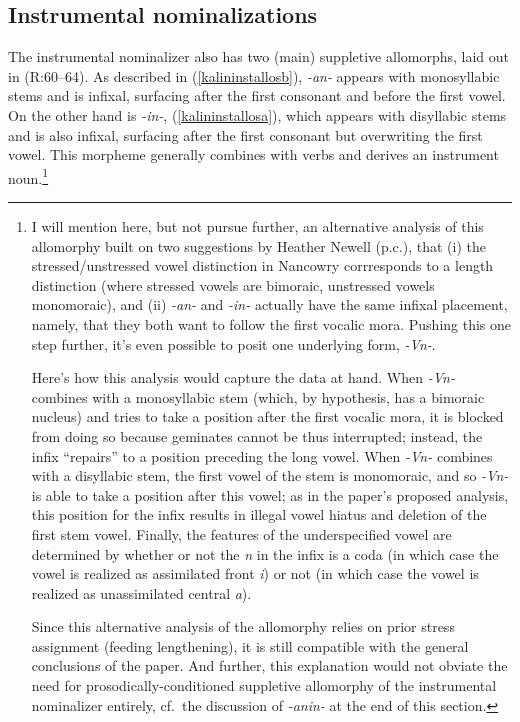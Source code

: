 \documentclass[output=paper]{langscibook}
\begin{document}
\subsection{Instrumental nominalizations}\label{sec:kalin:3.2}

The instrumental nominalizer also has two (main) suppletive allomorphs, laid out in \Next (R:60--64). As described in (\ref{kalininstallosb}), \textit{-an-} appears with monosyllabic stems and is infixal, surfacing after the first consonant and before the first vowel. On the other hand is \textit{-in-}, (\ref{kalininstallosa}), which appears with disyllabic stems and is also infixal, surfacing after the first consonant but overwriting the first vowel. This morpheme generally combines with verbs and derives an instrument noun.\footnote{I will mention here, but not pursue further, an alternative analysis of this allomorphy built on two suggestions by Heather Newell (p.c.), that (i) the stressed/unstressed vowel distinction in Nancowry corrresponds to a length distinction (where stressed vowels are bimoraic, unstressed vowels monomoraic), and (ii) \textit{-an-} and \textit{-in-} actually have the same infixal placement, namely, that they both want to follow the first vocalic mora. Pushing this one step further, it's even possible to posit one underlying form, \textit{-Vn-}. 

Here's how this analysis would capture the data at hand. When \textit{-Vn-} combines with a monosyllabic stem (which, by hypothesis, has a bimoraic nucleus) and tries to take a position after the first vocalic mora, it is blocked from doing so because geminates cannot be thus interrupted; instead, the infix ``repairs'' to a position preceding the long vowel. When \textit{-Vn-} combines with a disyllabic stem, the first vowel of the stem is monomoraic, and so \textit{-Vn-} is able to take a position after this vowel; as in the paper's proposed analysis, this position for the infix results in illegal vowel hiatus and deletion of the first stem vowel. Finally, the features of the underspecified vowel are determined by whether or not the \textit{n} in the infix is a coda (in which case the vowel is realized as assimilated front \textit{i}) or not (in which case the vowel is realized as unassimilated central \textit{a}). 

Since this alternative analysis of the allomorphy relies on prior stress assignment (feeding lengthening), it is still compatible with the general conclusions of the paper. And further, this explanation would not obviate the need for prosodically-conditioned suppletive allomorphy of the instrumental nominalizer entirely, cf.\ the discussion of \textit{-anin-} at the end of this section.\label{kalinfnheather}} 
\end{document}

